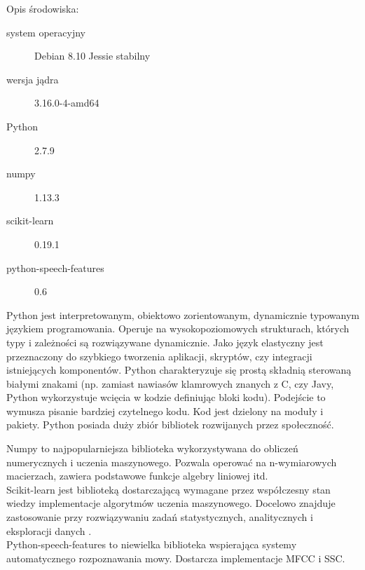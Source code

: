 \documentclass[a4paper,12pt,twoside,openany]{report}
\begin{document}
Opis środowiska:
\begin{description}
	\item [system operacyjny] Debian 8.10 Jessie stabilny 
	\item [wersja jądra] 3.16.0-4-amd64
	\item [Python] 2.7.9
	\item [numpy] 1.13.3
	\item [scikit-learn] 0.19.1
	\item [python-speech-features] 0.6
\end{description}
Python jest interpretowanym, obiektowo zorientowanym, dynamicznie typowanym językiem programowania.
Operuje na wysokopoziomowych strukturach, których typy i zależności są rozwiązywane dynamicznie.
Jako język elastyczny jest przeznaczony do szybkiego tworzenia aplikacji, skryptów, czy integracji istniejących komponentów.
Python charakteryzuje się prostą składnią sterowaną białymi znakami 
(np. zamiast nawiasów klamrowych znanych z C, czy Javy, Python wykorzystuje wcięcia w kodzie definiując bloki kodu).
Podejście to wymusza pisanie bardziej czytelnego kodu.
Kod jest dzielony na moduły i pakiety.
Python posiada duży zbiór bibliotek rozwijanych przez społeczność.

Numpy to najpopularniejsza biblioteka wykorzystywana do obliczeń numerycznych i uczenia maszynowego.
Pozwala operować na n-wymiarowych macierzach, zawiera podstawowe funkcje algebry liniowej itd.
\\
Scikit-learn jest biblioteką dostarczającą wymagane przez współczesny stan wiedzy implementacje algorytmów uczenia maszynowego.
Docelowo znajduje zastosowanie przy rozwiązywaniu zadań statystycznych, analitycznych i eksploracji danych \cite{OShaughnessy2008}.  
\\
Python-speech-features to niewielka biblioteka wspierająca systemy automatycznego rozpoznawania mowy. 
Dostarcza implementacje MFCC i SSC.
\end{document}
